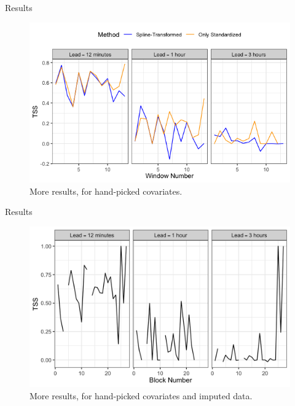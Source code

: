 \documentclass{beamer}
\begin{document}
\begin{frame}{Results}
    \begin{figure}[!htb]
        \centering
        \includegraphics[scale=0.5]{0101_results.png}
        \caption{More results, for hand-picked covariates.}
        \label{fig:0101_results}
    \end{figure}
\end{frame}

\begin{frame}{Results}
    \begin{figure}[!htb]
        \centering
        \includegraphics[scale=0.25]{0901_results.png}
        \caption{More results, for hand-picked covariates and imputed data.}
        \label{fig:0901_results}
    \end{figure}
\end{frame}
\end{document}
